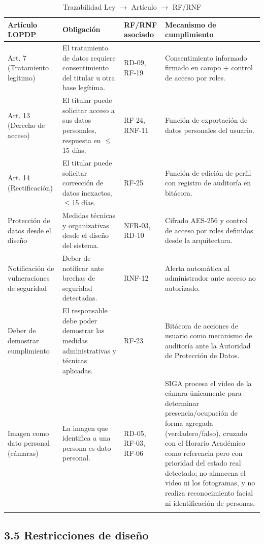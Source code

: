\begingroup
\small
\begin{longtable}{|p{3.9cm}|p{3.9cm}|p{3.9cm}|p{3.9cm}|}
\hline
Artículo LOPDP & Obligación & RF/RNF asociado & Mecanismo de cumplimiento \\ \hline
Art. 7 (Tratamiento legítimo) & El tratamiento de datos requiere consentimiento del titular u otra base legítima. & RD-09, RF-19 & Consentimiento informado firmado en campo + control de acceso por roles. \\ \hline
Art. 13 (Derecho de acceso) & El titular puede solicitar acceso a sus datos personales, respuesta en $\leq$15 días. & RF-24, RNF-11 & Función de exportación de datos personales del usuario. \\ \hline
Art. 14 (Rectificación) & El titular puede solicitar corrección de datos inexactos, $\leq$15 días. & RF-25 & Función de edición de perfil con registro de auditoría en bitácora. \\ \hline
Protección de datos desde el diseño & Medidas técnicas y organizativas desde el diseño del sistema. & NFR-03, RD-10 & Cifrado AES-256 y control de acceso por roles definidos desde la arquitectura. \\ \hline
Notificación de vulneraciones de seguridad & Deber de notificar ante brechas de seguridad detectadas. & RNF-12 & Alerta automática al administrador ante acceso no autorizado. \\ \hline
Deber de demostrar cumplimiento & El responsable debe poder demostrar las medidas administrativas y técnicas aplicadas. & RF-23 & Bitácora de acciones de usuario como mecanismo de auditoría ante la Autoridad de Protección de Datos. \\ \hline
Imagen como dato personal (cámaras) & La imagen que identifica a una persona es dato personal. & RD-05, RF-03, RF-06 & SIGA procesa el video de la cámara únicamente para determinar presencia/ocupación de forma agregada (verdadero/falso), cruzado con el Horario Académico como referencia pero con prioridad del estado real detectado; no almacena el video ni los fotogramas, y no realiza reconocimiento facial ni identificación de personas. \\ \hline
\caption{Trazabilidad Ley $\rightarrow$ Artículo $\rightarrow$ RF/RNF}
\end{longtable}
\endgroup

\subsection*{3.5 Restricciones de diseño}

